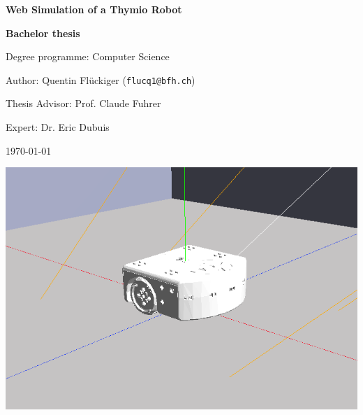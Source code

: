 \documentclass{scrreprt}
\begin{document}
\begin{titlepage}
  \begin{center}
    {\LARGE \bfseries\sffamily Web Simulation of a Thymio Robot}
    \vspace{2mm}

    {\bfseries Bachelor thesis}
    \vspace{1cm}

    {\large Degree programme: Computer Science}
    \vspace{2mm}

    {\large Author: Quentin Flückiger (\texttt{flucq1@bfh.ch})}
    \vspace{2mm}

    {\large Thesis Advisor: Prof. Claude Fuhrer}
    \vspace{2mm}

    {\large Expert: Dr. Eric Dubuis}
    \vspace{2mm}

    \today
    \vspace{2cm}

    \includegraphics[width=\textwidth]{./title}
  \end{center}
\end{titlepage}

\clearpage
\end{document}
